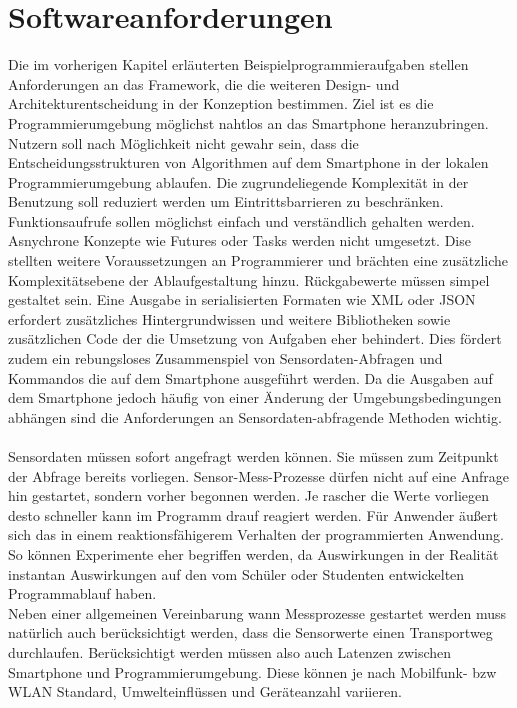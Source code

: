 \documentclass[11pt,a4paper]{report}
\begin{document}
\section{Softwareanforderungen}\label{sec:anforderungen}
Die im vorherigen Kapitel erläuterten Beispielprogrammieraufgaben stellen Anforderungen an das Framework, die die weiteren Design- und Architekturentscheidung in der Konzeption bestimmen.
Ziel ist es die Programmierumgebung möglichst nahtlos an das Smartphone heranzubringen.
Nutzern soll nach Möglichkeit nicht gewahr sein, dass die Entscheidungsstrukturen von Algorithmen auf dem Smartphone in der lokalen Programmierumgebung ablaufen.
Die zugrundeliegende Komplexität in der Benutzung soll reduziert werden um Eintrittsbarrieren zu beschränken.
Funktionsaufrufe sollen möglichst einfach und verständlich gehalten werden.
Asnychrone Konzepte wie Futures oder Tasks werden nicht umgesetzt.
Dise stellten weitere Voraussetzungen an Programmierer und brächten eine zusätzliche Komplexitätsebene der Ablaufgestaltung hinzu.
Rückgabewerte müssen simpel gestaltet sein.
Eine Ausgabe in serialisierten Formaten wie XML oder JSON erfordert zusätzliches Hintergrundwissen und weitere Bibliotheken sowie zusätzlichen Code der die Umsetzung von Aufgaben eher behindert.
Dies fördert zudem ein rebungsloses Zusammenspiel von Sensordaten-Abfragen und Kommandos die auf dem Smartphone ausgeführt werden.
Da die Ausgaben auf dem Smartphone jedoch häufig von einer Änderung der Umgebungsbedingungen abhängen sind die Anforderungen an Sensordaten-abfragende Methoden wichtig.
\\\\
Sensordaten müssen sofort angefragt werden können.
Sie müssen zum Zeitpunkt der Abfrage bereits vorliegen.
Sensor-Mess-Prozesse dürfen nicht auf eine Anfrage hin gestartet, sondern vorher begonnen werden.
Je rascher die Werte vorliegen desto schneller kann im Programm drauf reagiert werden.
Für Anwender äußert sich das in einem reaktionsfähigerem Verhalten der programmierten Anwendung.
So können Experimente eher begriffen werden, da Auswirkungen in der Realität instantan Auswirkungen auf den vom Schüler oder Studenten entwickelten Programmablauf haben.
\\
Neben einer allgemeinen Vereinbarung wann Messprozesse gestartet werden muss natürlich auch berücksichtigt werden, dass die Sensorwerte einen Transportweg durchlaufen.
Berücksichtigt werden müssen also auch Latenzen zwischen Smartphone und Programmierumgebung.
Diese können je nach Mobilfunk- bzw WLAN Standard, Umwelteinflüssen und Geräteanzahl variieren.
\end{document}
